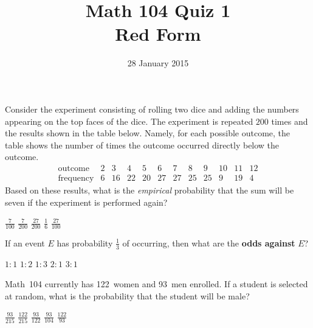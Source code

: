 \documentclass[answers,12pt]{exam}
\title{Math 104 Quiz 1\\Red Form}
\date{28 January 2015}
\begin{document}
\maketitle

\begin{center}
\end{center}

\begin{questions}

\question Consider the experiment consisting
of rolling two dice and adding the numbers
appearing on the top faces of the dice.
The experiment is repeated $200$ times and the
results shown in the table below. Namely, 
for each possible outcome, the table shows the number
of times the outcome occurred directly below the outcome.
\[\begin{array}{r|ccccccccccc}
\text{outcome}&2&3&4&5&6&7&8&9&10&11&12\\\hline
\text{frequency}&6&16&22&20&27&27&25&25&9&19&4
\end{array}\]
Based on these results, what is the {\em empirical} probability
that the sum will be seven if the experiment is performed again?\\
\begin{oneparchoices}
\choice $\frac{7}{100}$
\choice $\frac{7}{200}$
\correctchoice $\frac{27}{200}$
\choice $\frac{1}{6}$
\choice $\frac{27}{100}$
\end{oneparchoices}

\question If an event $E$ has probability $\frac{1}{3}$
of occurring, then what are the {\bf odds against} $E$?\\
\begin{oneparchoices}
\choice $1:1$
\choice $1:2$ %
\choice $1:3$ %
\correctchoice $2:1$
\choice $3:1$ %
\end{oneparchoices}

\question Math~104 currently has 122~women and 93~men enrolled.
If a student is selected at random, what is the probability
that the student will be male?\\
\begin{oneparchoices}
\correctchoice $\frac{93}{215}$
\choice $\frac{122}{215}$
\choice $\frac{93}{122}$
\choice $\frac{93}{104}$
\choice $\frac{122}{93}$
\end{oneparchoices}


\end{questions}
\end{document}
